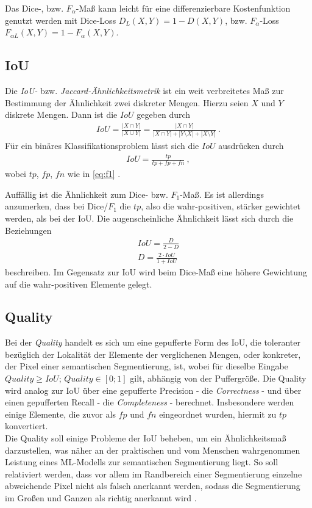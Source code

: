 Das Dice-, bzw. $F_{\alpha}$-Maß kann leicht für eine differenzierbare Kostenfunktion genutzt werden mit Dice-Loss $D_{L}(X, Y) = 1 - D(X,Y)$, bzw. $F_{\alpha}$-Loss $F_{\alpha L}(X,Y) = 1 - F_{\alpha}(X,Y)$. 


\subsection{\acf{IoU}}

Die \textit{\acf{IoU}-} bzw. \textit{Jaccard-Ähnlichkeitsmetrik} ist ein weit verbreitetes Maß zur Bestimmung der Ähnlichkeit zwei diskreter Mengen. Hierzu seien $X$ und $Y$ diskrete Mengen. Dann ist die $IoU$ gegeben durch 
\begin{align}
	\label{eq:iou} IoU = \frac{|X\cap Y|}{|X \cup Y|} = \frac{| X \cap Y |}{| X \cap Y | + |Y \setminus X| + |X \setminus Y|}~.
\end{align} 
Für ein binäres Klassifikationsproblem lässt sich die $IoU$ ausdrücken durch 
\begin{align}
	\label{eq:iou-binary} IoU = \frac{tp}{tp + fp + fn}~,
\end{align}
wobei $tp$, $fp$, $fn$ wie in \autoref{eq:f1} \cite{Fletcher.2018}. 

Auffällig ist die Ähnlichkeit zum Dice- bzw. $F_{1}$-Maß. Es ist allerdings anzumerken, dass bei Dice/$F_1$ die $tp$, also die wahr-positiven, stärker gewichtet werden, als bei der \ac{IoU}. Die augenscheinliche Ähnlichkeit lässt sich durch die Beziehungen
\begin{align}
	\label{eq:dice-iou} IoU = \frac{D}{2 - D} \\
	D = \frac{2 \cdot IoU}{1 + IoU}
\end{align}
beschreiben.
Im Gegensatz zur \ac{IoU} wird beim Dice-Maß eine höhere Gewichtung auf die wahr-positiven Elemente 
gelegt.

\subsection{Quality}

Bei der \textit{Quality} handelt es sich um eine gepufferte Form des \ac{IoU},
die toleranter bezüglich der Lokalität der Elemente der verglichenen Mengen, oder konkreter,
der Pixel einer semantischen Segmentierung, ist, 
wobei für dieselbe Eingabe $Quality \geq IoU$; $Quality \in [0;1]$ gilt, abhängig von der Puffergröße. 
Die Quality wird analog zur \ac{IoU} über eine gepufferte Precision - die \textit{Correctness} - 
und über einen gepufferten Recall - die \textit{Completeness} - berechnet. Insbesondere werden einige Elemente, 
die zuvor als $fp$ und $fn$ eingeordnet wurden, hiermit zu $tp$ konvertiert. \\
Die Quality soll einige Probleme der \ac{IoU} beheben, um ein Ähnlichkeitsmaß darzustellen, 
was näher an der praktischen und vom Menschen wahrgenommen Leistung eines \ac{ML}-Modells zur semantischen Segmentierung liegt.
So soll relativiert werden, dass vor allem im Randbereich einer Segmentierung einzelne abweichende Pixel
nicht als falsch anerkannt werden, sodass die Segmentierung im Großen und Ganzen als richtig anerkannt wird \cite{ChristianWiedemann.1998}. 


